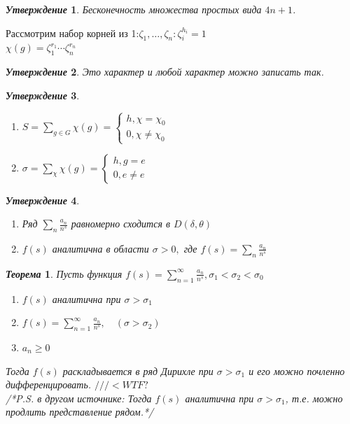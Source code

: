 \documentclass[a4paper,12pt]{article}
\newtheorem{teo2}{\textit{Теорема}}
\newtheorem{utv2}{\textit{Утверждение}}
\newcommand{\TE}{\theta}
\newcommand{\q}{\quad}
\newcommand{\SL}{\sum\limits}
\begin{document}
\begin{formbox}{}
\begin{utv2} Бесконечность множества простых вида $4n+1$.
\end{utv2}
\end{formbox}
\begin{formbox}{}
Рассмотрим набор корней из 1:$\zeta_1,\dots,\zeta_n: \zeta_i^{h_i} = 1$\\
$\chi(g) = \zeta_1^{r_1}\cdots \zeta_n^{r_n}$
\begin{utv2} Это характер и любой характер можно записать так.
\end{utv2}
\end{formbox}
\begin{formbox}{}
\begin{utv2}\q\\
\begin{enumerate}
\item $S = \SL_{g\in G}\chi(g) = \begin{cases}h, \chi = \chi_0\\ 0, \chi \not= \chi_0\end{cases}$
\item $\sigma = \SL_{\chi}\chi(g) = \begin{cases}h, g = e\\ 0, e \not= e\end{cases}$
\end{enumerate}
\end{utv2}
\end{formbox}
\begin{formbox}{}
\begin{utv2}\q\\
\begin{enumerate}
\item Ряд $\SL_n \frac{a_n}{n^s} $ равномерно сходится в $D(\delta, \TE)$
\item $f(s)$ аналитична в области $\sigma > 0,$ где $f(s) = \SL_n\frac{a_n}{n^s}$
\end{enumerate}
\end{utv2}
\end{formbox}
\begin{formbox}{}
\begin{teo2} Пусть функция $f(s) = \SL_{n=1}^\infty \frac{a_n}{n^s}, \sigma_1 <\sigma_2 < \sigma_0 $
\begin{enumerate}
\item $f(s)$ аналитична при $\sigma > \sigma_1$
\item $f(s) = \SL_{n=1}^\infty  \frac{a_n}{n^s},\q(\sigma > \sigma_2) $
\item $a_n \ge 0$
\end{enumerate}
Тогда $f(s)$ раскладывается в ряд Дирихле при $\sigma > \sigma_1$ и его можно почленно дифференцировать. $///<WTF?$\\
/*P.S. в другом источнике: Тогда $f(s)$ аналитична при $\sigma > \sigma_1$, т.е. можно продлить представление рядом.*/
\end{teo2}
\end{formbox}
\end{document}
